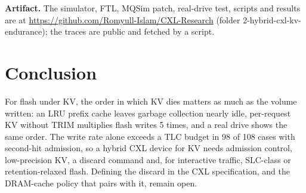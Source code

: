 \documentclass[acmsmall,screen,review]{acmart}
\begin{document}
\textbf{Artifact.} The simulator, FTL, MQSim patch, real-drive test, scripts and results are at
\url{https://github.com/Romyull-Islam/CXL-Research} (folder 2-hybrid-cxl-kv-endurance); the traces
are public and fetched by a script.

\section{Conclusion}
For flash under KV, the order in which KV dies matters as much as the volume written: an LRU prefix
cache leaves garbage collection nearly idle, per-request KV without TRIM multiplies flash writes 5
times, and a real drive shows the same order. The write rate alone exceeds a TLC budget in 98 of 108
cases with second-hit admission, so a hybrid CXL device for KV needs admission control, low-precision
KV, a discard command and, for interactive traffic, SLC-class or retention-relaxed flash. Defining the
discard in the CXL specification, and the DRAM-cache policy that pairs with it, remain open.



\end{document}
